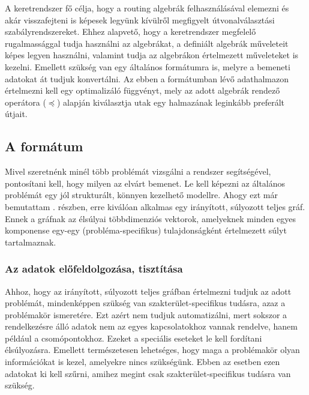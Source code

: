   A keretrendszer fő célja, hogy a routing algebrák felhasználásával elemezni és akár visszafejteni is képesek legyünk kívülről megfigyelt útvonalválasztási szabályrendszereket. Ehhez alapvető, hogy a keretrendszer megfelelő rugalmassággal tudja használni az algebrákat, a definiált algebrák műveleteit képes legyen használni, valamint tudja az algebrákon értelmezett műveleteket is kezelni. Emellett szükség van egy általános formátumra is, melyre a bemeneti adatokat át tudjuk konvertálni. Az ebben a formátumban lévő adathalmazon értelmezni kell egy optimalizáló függvényt, mely az adott algebrák rendező operátora ($\preceq$) alapján kiválasztja utak egy halmazának leginkább preferált útjait.

    \subsection{A formátum}
    Mivel szeretnénk minél több problémát vizsgálni a rendszer segítségével, pontosítani kell, hogy milyen az elvárt bemenet. Le kell képezni az általános problémát egy jól strukturált, könnyen kezelhető modellre. Ahogy ezt már bemutattam . részben, erre kiválóan alkalmas egy irányított, súlyozott teljes gráf. Ennek a gráfnak az élsúlyai többdimenziós vektorok, amelyeknek minden egyes komponense egy-egy (probléma-specifikus) tulajdonságként értelmezett súlyt tartalmaznak.

      \subsubsection{Az adatok előfeldolgozása, tisztítása}\label{prep}
      Ahhoz, hogy az irányított, súlyozott teljes gráfban értelmezni tudjuk az adott problémát, mindenképpen szükség van szakterület-specifikus tudásra, azaz a problémakör ismeretére. Ezt azért nem tudjuk automatizálni, mert sokszor a rendelkezésre álló adatok nem az egyes kapcsolatokhoz vannak rendelve, hanem például a csomópontokhoz. Ezeket a speciális eseteket le kell fordítani élsúlyozásra. Emellett természetesen lehetséges, hogy maga a problémakör olyan információkat is kezel, amelyekre nincs szükségünk. Ebben az esetben ezen adatokat ki kell szűrni, amihez megint csak szakterület-specifikus tudásra van szükség.\\

